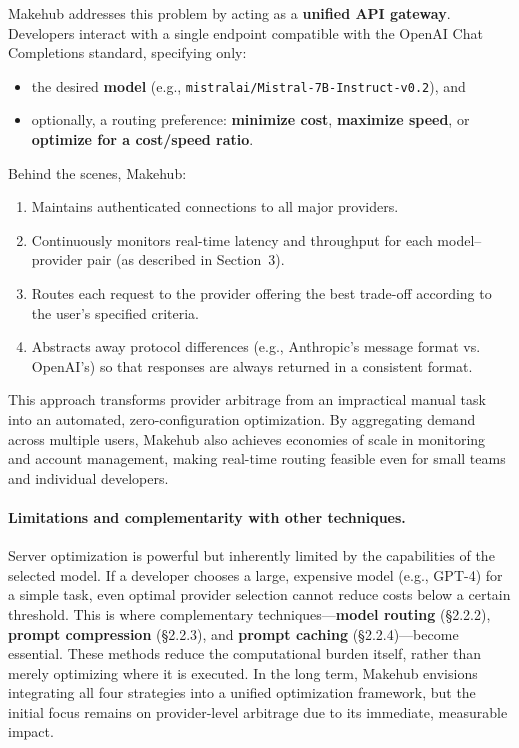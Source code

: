 \documentclass[english]{article}
\begin{document}
Makehub addresses this problem by acting as a \textbf{unified API gateway}. Developers interact with a single endpoint compatible with the OpenAI Chat Completions standard, specifying only:
\begin{itemize}
    \item the desired \textbf{model} (e.g., \texttt{mistralai/Mistral-7B-Instruct-v0.2}), and
    \item optionally, a routing preference: \textbf{minimize cost}, \textbf{maximize speed}, or \textbf{optimize for a cost/speed ratio}.
\end{itemize}

Behind the scenes, Makehub:
\begin{enumerate}
    \item Maintains authenticated connections to all major providers.
    \item Continuously monitors real-time latency and throughput for each model–provider pair (as described in Section~3).
    \item Routes each request to the provider offering the best trade-off according to the user's specified criteria.
    \item Abstracts away protocol differences (e.g., Anthropic's message format vs. OpenAI's) so that responses are always returned in a consistent format.
\end{enumerate}

This approach transforms provider arbitrage from an impractical manual task into an automated, zero-configuration optimization. By aggregating demand across multiple users, Makehub also achieves economies of scale in monitoring and account management, making real-time routing feasible even for small teams and individual developers.

\paragraph{Limitations and complementarity with other techniques.}

Server optimization is powerful but inherently limited by the capabilities of the selected model. If a developer chooses a large, expensive model (e.g., GPT-4) for a simple task, even optimal provider selection cannot reduce costs below a certain threshold. This is where complementary techniques—\textbf{model routing} (§2.2.2), \textbf{prompt compression} (§2.2.3), and \textbf{prompt caching} (§2.2.4)—become essential. These methods reduce the computational burden itself, rather than merely optimizing where it is executed. In the long term, Makehub envisions integrating all four strategies into a unified optimization framework, but the initial focus remains on provider-level arbitrage due to its immediate, measurable impact.
\end{document}
